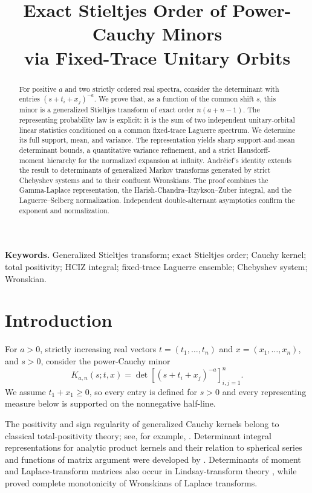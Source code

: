 \documentclass[11pt]{article}
\title{Exact Stieltjes Order of Power-Cauchy Minors\\
via Fixed-Trace Unitary Orbits}
\author{}
\date{}
\theoremstyle{definition}
\theoremstyle{remark}
\begin{document}
\maketitle

\begin{abstract}
For positive $a$ and two strictly ordered real spectra, consider the
determinant with entries $(s+t_i+x_j)^{-a}$. We prove that, as a function of
the common shift $s$, this minor is a generalized Stieltjes transform of exact
order $n(a+n-1)$. The representing probability law is explicit: it is the sum
of two independent unitary-orbital linear statistics conditioned on a common
fixed-trace Laguerre spectrum. We determine its full support, mean, and
variance. The representation yields sharp support-and-mean determinant bounds,
a quantitative variance refinement, and a strict Hausdorff-moment hierarchy
for the normalized expansion at infinity. Andr\'eief's identity extends the
result to determinants of generalized Markov transforms generated by strict
Chebyshev systems and to their confluent Wronskians. The proof combines the
Gamma-Laplace representation, the Harish-Chandra--Itzykson--Zuber integral,
and the Laguerre--Selberg normalization. Independent double-alternant
asymptotics confirm the exponent and normalization.
\end{abstract}

\noindent\textbf{Keywords.}
Generalized Stieltjes transform; exact Stieltjes order; Cauchy kernel; total
positivity; HCIZ integral; fixed-trace Laguerre ensemble; Chebyshev system;
Wronskian.

\section{Introduction}

For $a>0$, strictly increasing real vectors $t=(t_1,\ldots,t_n)$ and
$x=(x_1,\ldots,x_n)$, and $s>0$, consider the power-Cauchy minor
\begin{equation}\label{eq:kernel-minor}
K_{a,n}(s;t,x)
=\det\left[(s+t_i+x_j)^{-a}\right]_{i,j=1}^{n}.
\end{equation}
We assume $t_1+x_1\ge0$, so every entry is defined for $s>0$ and every
representing measure below is supported on the nonnegative half-line.

The positivity and sign regularity of generalized Cauchy kernels belong to
classical total-positivity theory; see, for example,
\citet{DetteMunk1996}. Determinant integral representations for analytic
product kernels and their relation to spherical series and functions of matrix
argument were developed by \citet{GrossRichards1989}. Determinants of moment
and Laplace-transform matrices also occur in Lindsay-transform theory
\citep{KokonendjiSeshadri1996}, while \citet{DimitrovXu2019} proved complete
monotonicity of Wronskians of Laplace transforms.
\end{document}
